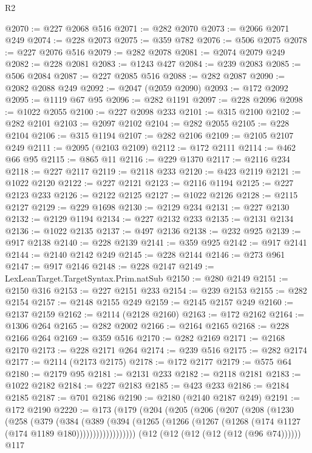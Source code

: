 \begin{lexlean}{R2}
\begin{coremodule}
@2070 := @227 @2068 @516
@2071 := @282 @2070
@2073 := @2066 @2071 @249
@2074 := @228 @2073
@2075 := @359 @782
@2076 := @506 @2075
@2078 := @227 @2076 @516
@2079 := @282 @2078
@2081 := @2074 @2079 @249
@2082 := @228 @2081
@2083 := @1243 @427
@2084 := @239 @2083
@2085 := @506 @2084
@2087 := @227 @2085 @516
@2088 := @282 @2087
@2090 := @2082 @2088 @249
@2092 := @2047 (@2059 @2090)
@2093 := @172 @2092
@2095 := @1119 @67 @95
@2096 := @282 @1191
@2097 := @228 @2096
@2098 := @1022 @2055
@2100 := @227 @2098 @233
@2101 := @315 @2100
@2102 := @282 @2101
@2103 := @2097 @2102
@2104 := @282 @2055
@2105 := @228 @2104
@2106 := @315 @1194
@2107 := @282 @2106
@2109 := @2105 @2107 @249
@2111 := @2095 (@2103 @2109)
@2112 := @172 @2111
@2114 := @462 @66 @95
@2115 := @865 @11
@2116 := @229 @1370
@2117 := @2116 @234
@2118 := @227 @2117
@2119 := @2118 @233
@2120 := @423 @2119
@2121 := @1022 @2120
@2122 := @227 @2121
@2123 := @2116 @1194
@2125 := @227 @2123 @233
@2126 := @2122 @2125
@2127 := @1022 @2126
@2128 := @2115 @2127
@2129 := @229 @1698
@2130 := @2129 @234
@2131 := @227 @2130
@2132 := @2129 @1194
@2134 := @227 @2132 @233
@2135 := @2131 @2134
@2136 := @1022 @2135
@2137 := @497 @2136
@2138 := @232 @925
@2139 := @917 @2138
@2140 := @228 @2139
@2141 := @359 @925
@2142 := @917 @2141
@2144 := @2140 @2142 @249
@2145 := @228 @2144
@2146 := @273 @961
@2147 := @917 @2146
@2148 := @228 @2147
@2149 := LexLeanTarget.TargetSyntax.Prim.natSub
@2150 := @280 @2149
@2151 := @2150 @316
@2153 := @227 @2151 @233
@2154 := @239 @2153
@2155 := @282 @2154
@2157 := @2148 @2155 @249
@2159 := @2145 @2157 @249
@2160 := @2137 @2159
@2162 := @2114 (@2128 @2160)
@2163 := @172 @2162
@2164 := @1306 @264
@2165 := @282 @2002
@2166 := @2164 @2165
@2168 := @228 @2166 @264
@2169 := @359 @516
@2170 := @282 @2169
@2171 := @2168 @2170
@2173 := @228 @2171 @264
@2174 := @239 @516
@2175 := @282 @2174
@2177 := @2114 (@2173 @2175)
@2178 := @172 @2177
@2179 := @575 @64
@2180 := @2179 @95
@2181 := @2131 @233
@2182 := @2118 @2181
@2183 := @1022 @2182
@2184 := @227 @2183
@2185 := @423 @233
@2186 := @2184 @2185
@2187 := @701 @2186
@2190 := @2180 (@2140 @2187 @249)
@2191 := @172 @2190
@2220 := @173
    (@179
      (@204
        (@205
          (@206
            (@207
              (@208
                (@1230
                  (@258
                    (@379
                      (@384
                        (@389
                          (@394
                            (@1265
                              (@1266 (@1267 (@1268 (@174 @1127 (@174 @1189 @180))))))))))))))))))
    (@12 (@12 (@12 (@12 (@12 (@96 @74))))))
    @117

\end{coremodule}
\end{lexlean}
